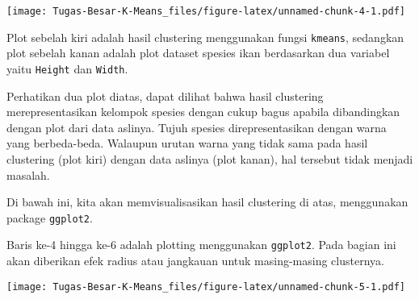 \documentclass[
]{article}
\newenvironment{Shaded}{\begin{snugshade}}{\end{snugshade}}
\newcommand{\DataTypeTok}[1]{\textcolor[rgb]{0.13,0.29,0.53}{#1}}
\newcommand{\DecValTok}[1]{\textcolor[rgb]{0.00,0.00,0.81}{#1}}
\newcommand{\FloatTok}[1]{\textcolor[rgb]{0.00,0.00,0.81}{#1}}
\newcommand{\KeywordTok}[1]{\textcolor[rgb]{0.13,0.29,0.53}{\textbf{#1}}}
\newcommand{\NormalTok}[1]{#1}
\newcommand{\OperatorTok}[1]{\textcolor[rgb]{0.81,0.36,0.00}{\textbf{#1}}}
\newcommand{\OtherTok}[1]{\textcolor[rgb]{0.56,0.35,0.01}{#1}}
\newcommand{\StringTok}[1]{\textcolor[rgb]{0.31,0.60,0.02}{#1}}
\begin{document}
\texttt{[image: Tugas-Besar-K-Means\_files/figure-latex/unnamed-chunk-4-1.pdf]}

Plot sebelah kiri adalah hasil clustering menggunakan fungsi
\texttt{kmeans}, sedangkan plot sebelah kanan adalah plot dataset
spesies ikan berdasarkan dua variabel yaitu \texttt{Height} dan
\texttt{Width}.

Perhatikan dua plot diatas, dapat dilihat bahwa hasil clustering
merepresentasikan kelompok spesies dengan cukup bagus apabila
dibandingkan dengan plot dari data aslinya. Tujuh spesies
direpresentasikan dengan warna yang berbeda-beda. Walaupun urutan warna
yang tidak sama pada hasil clustering (plot kiri) dengan data aslinya
(plot kanan), hal tersebut tidak menjadi masalah.

Di bawah ini, kita akan memvisualisasikan hasil clustering di atas,
menggunakan package \texttt{ggplot2}.

Baris ke-4 hingga ke-6 adalah plotting menggunakan \texttt{ggplot2}.
Pada bagian ini akan diberikan efek radius atau jangkauan untuk
masing-masing clusternya.

\begin{Shaded}
\end{Shaded}

\texttt{[image: Tugas-Besar-K-Means\_files/figure-latex/unnamed-chunk-5-1.pdf]}
\end{document}
